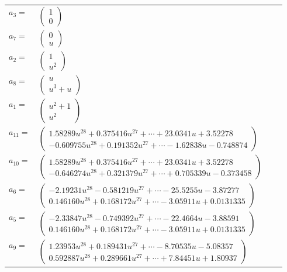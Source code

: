 \documentclass[1p]{elsarticle_modified}
\theoremstyle{definition}
\begin{document}
\begin{tabular}{m{7pt} m{180pt} m{7pt} m{180pt} }
\flushright $a_{3}=$&$\begin{pmatrix}1\\0\end{pmatrix}$ \\
\flushright $a_{7}=$&$\begin{pmatrix}0\\u\end{pmatrix}$ \\
\flushright $a_{2}=$&$\begin{pmatrix}1\\u^2\end{pmatrix}$ \\
\flushright $a_{8}=$&$\begin{pmatrix}u\\u^3+u\end{pmatrix}$ \\
\flushright $a_{1}=$&$\begin{pmatrix}u^2+1\\u^2\end{pmatrix}$ \\
\flushright $a_{11}=$&$\begin{pmatrix}1.58289 u^{28}+0.375416 u^{27}+\cdots+23.0341 u+3.52278\\-0.609755 u^{28}+0.191352 u^{27}+\cdots-1.62838 u-0.748874\end{pmatrix}$ \\
\flushright $a_{10}=$&$\begin{pmatrix}1.58289 u^{28}+0.375416 u^{27}+\cdots+23.0341 u+3.52278\\-0.646274 u^{28}+0.321379 u^{27}+\cdots+0.705339 u-0.373458\end{pmatrix}$ \\
\flushright $a_{6}=$&$\begin{pmatrix}-2.19231 u^{28}-0.581219 u^{27}+\cdots-25.5255 u-3.87277\\0.146160 u^{28}+0.168172 u^{27}+\cdots-3.05911 u+0.0131335\end{pmatrix}$ \\
\flushright $a_{5}=$&$\begin{pmatrix}-2.33847 u^{28}-0.749392 u^{27}+\cdots-22.4664 u-3.88591\\0.146160 u^{28}+0.168172 u^{27}+\cdots-3.05911 u+0.0131335\end{pmatrix}$ \\
\flushright $a_{9}=$&$\begin{pmatrix}1.23953 u^{28}+0.189431 u^{27}+\cdots-8.70535 u-5.08357\\0.592887 u^{28}+0.289661 u^{27}+\cdots+7.84451 u+1.80937\end{pmatrix}$ \\

\end{tabular}
\end{document}
